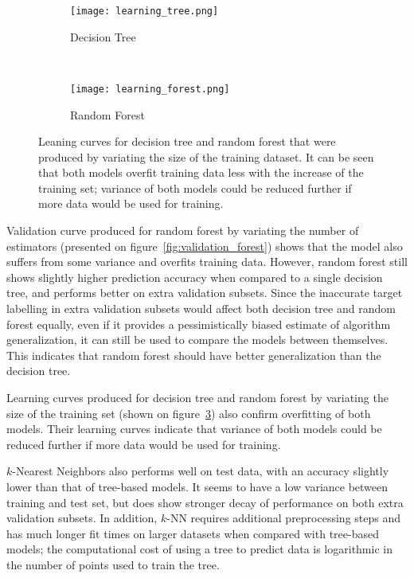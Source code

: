 \begin{figure}[hbt!]
    \centering
    \begin{subfigure}[t]{.47\textwidth}
        \centering
        \texttt{[image: learning\_tree.png]}
        \caption{Decision Tree}
        \label{fig:learning_tree}
    \end{subfigure}
    ~ %
    \begin{subfigure}[t]{.48\textwidth}
        \centering
        \texttt{[image: learning\_forest.png]}
        \caption{Random Forest}
        \label{fig:learning_forest}
    \end{subfigure}
    \caption{Leaning curves for decision tree and random forest that were produced by variating the size of the training dataset.
    It can be seen that both models overfit training data less with the increase of the training set;
    variance of both models could be reduced further if more data would be used for training.}
    \label{fig:learning_curves}
\end{figure}

Validation curve produced for random forest by variating the number of estimators (presented on figure~\ref{fig:validation_forest}) shows that the model also suffers from some variance and overfits training data.
However, random forest still shows slightly higher prediction accuracy when compared to a single decision tree, and performs better on extra validation subsets.
Since the inaccurate target labelling in extra validation subsets would affect both decision tree and random forest equally, even if it provides a pessimistically biased estimate of algorithm generalization, it can still be used to compare the models between themselves\cite{Raschka2018}.
This indicates that random forest should have better generalization than the decision tree.

Learning curves produced for decision tree and random forest by variating the size of the training set (shown on figure~\ref{fig:learning_curves}) also confirm overfitting of both models.
Their learning curves indicate that variance of both models could be reduced further if more data would be used for training.

$k$-Nearest Neighbors also performs well on test data, with an accuracy slightly lower than that of tree-based models.
It seems to have a low variance between training and test set, but does show stronger decay of performance on both extra validation subsets.
In addition, $k$-NN requires additional preprocessing steps and has much longer fit times on larger datasets when compared with tree-based models;
the computational cost of using a tree to predict data is logarithmic in the number of points used to train the tree.

